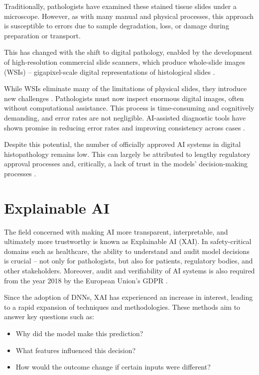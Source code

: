 Traditionally, pathologists have examined these stained tissue slides under a microscope.
However, as with many manual and physical processes, this approach is susceptible to errors due to sample degradation, loss, or damage during preparation or transport.

This has changed with the shift to digital pathology, enabled by the development of high-resolution commercial slide scanners,
which produce whole-slide images (WSIs) -- gigapixel-scale digital representations of histological slides \cite{cooper2023machine}.

While WSIs eliminate many of the limitations of physical slides,
they introduce new challenges \cite{aeffner2019introduction}.
Pathologists must now inspect enormous digital images,
often without computational assistance. This process is time-consuming and cognitively demanding,
and error rates are not negligible. AI-assisted diagnostic tools have shown promise in reducing error rates
and improving consistency across cases \cite{dy2024ai}.

Despite this potential, the number of officially approved AI systems in digital histopathology remains low.
This can largely be attributed to lengthy regulatory approval processes and,
critically, a lack of trust in the models' decision-making processes \cite{aggarwal2025artificial}.


\section{Explainable AI}

The field concerned with making AI more transparent, interpretable, and ultimately more trustworthy is known as Explainable AI (XAI).
In safety-critical domains such as healthcare, the ability to understand and audit model decisions is crucial -- not only for pathologists,
but also for patients, regulatory bodies, and other stakeholders. Moreover, audit and verifiability of AI systems is also required
from the year 2018 by the European Union's GDPR \cite{goodman2017european}.

\newpage

Since the adoption of DNNs, XAI has experienced an increase in interest,
leading to a rapid expansion of techniques and methodologies.
These methods aim to answer key questions such as:
\begin{itemize}
    \item Why did the model make this prediction?
    \item What features influenced this decision?
    \item How would the outcome change if certain inputs were different?
\end{itemize}

